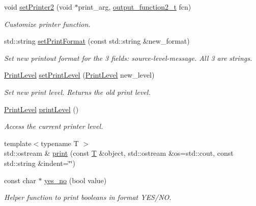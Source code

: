 \begin{DoxyCompactItemize}
void \hyperlink{namespace_d_d4hep_a5109e91adaa5c7b3de87e2f53291ff64}{setPrinter2} (void $\ast$print\_\-arg, \hyperlink{namespace_d_d4hep_a782306f3df224bf6e5be62c498715cd1}{output\_\-function2\_\-t} fcn)
\begin{DoxyCompactList}\small\item\em Customize printer function. \item\end{DoxyCompactList}\item 
std::string \hyperlink{namespace_d_d4hep_ac123c32a67d87f38c9cfcdbf67e0fe19}{setPrintFormat} (const std::string \&new\_\-format)
\begin{DoxyCompactList}\small\item\em Set new printout format for the 3 fields: source-\/level-\/message. All 3 are strings. \item\end{DoxyCompactList}\item 
\hyperlink{namespace_d_d4hep_a5b5a64d56252469451f2020a27d57d42}{PrintLevel} \hyperlink{namespace_d_d4hep_a01aab75bd90e7887aaec1fbf3b4eb03d}{setPrintLevel} (\hyperlink{namespace_d_d4hep_a5b5a64d56252469451f2020a27d57d42}{PrintLevel} new\_\-level)
\begin{DoxyCompactList}\small\item\em Set new print level. Returns the old print level. \item\end{DoxyCompactList}\item 
\hyperlink{namespace_d_d4hep_a5b5a64d56252469451f2020a27d57d42}{PrintLevel} \hyperlink{namespace_d_d4hep_abdbd705fe59353c8596e4ad5b7355814}{printLevel} ()
\begin{DoxyCompactList}\small\item\em Access the current printer level. \item\end{DoxyCompactList}\item 
{\footnotesize template$<$typename T $>$ }\\std::ostream \& \hyperlink{namespace_d_d4hep_af6eaaa572e33854eafc208b2ff8fc463}{print} (const \hyperlink{class_t}{T} \&object, std::ostream \&os=std::cout, const std::string \&indent=\char`\"{}\char`\"{})
\item 
const char $\ast$ \hyperlink{namespace_d_d4hep_a9b6e2c5ab00340e93017e18604b0cb85}{yes\_\-no} (bool value)
\begin{DoxyCompactList}\small\item\em Helper function to print booleans in format YES/NO. \item\end{DoxyCompactList}\item 

\end{DoxyCompactItemize}
